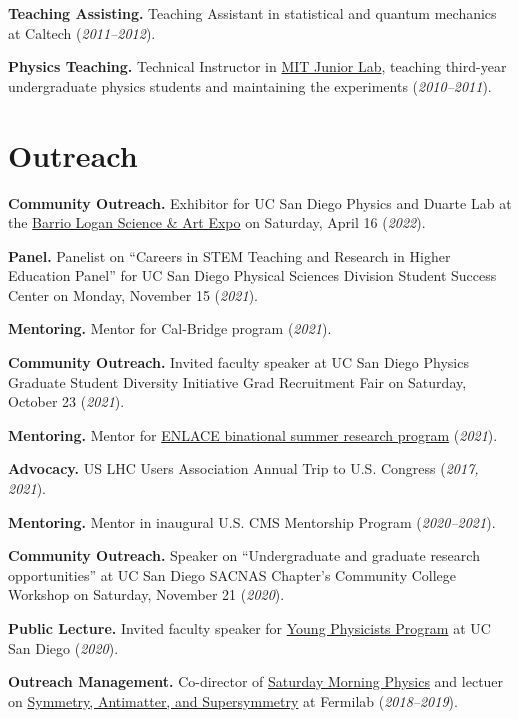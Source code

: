 \documentclass{res}
\newcommand{\MarginText}[1]{\section{#1}\vspace{10pt}}
\begin{document}
\begin{resume}
  \textbf{Teaching Assisting.} Teaching Assistant in statistical and quantum mechanics at Caltech (\textit{2011--2012}).

  \textbf{Physics Teaching.} Technical Instructor in \href{http://web.mit.edu/8.13/www/index.shtml}{MIT Junior Lab}, teaching third-year undergraduate physics students and maintaining the experiments (\textit{2010--2011}).


  \MarginText{Outreach}

  \textbf{Community Outreach.} Exhibitor for UC San Diego Physics and Duarte Lab at the \href{https://www.barriologansae.com/}{Barrio Logan Science \& Art Expo} on Saturday, April 16 (\textit{2022}).

  \textbf{Panel.} Panelist on ``Careers in STEM Teaching and Research in Higher Education Panel'' for UC San Diego Physical Sciences Division Student Success Center on Monday, November 15 (\textit{2021}).

  \textbf{Mentoring.} Mentor for Cal-Bridge program (\textit{2021}).

  \textbf{Community Outreach.} Invited faculty speaker at UC San Diego Physics Graduate Student Diversity Initiative Grad Recruitment Fair on Saturday, October 23 (\textit{2021}).

  \textbf{Mentoring.} Mentor for \href{http://resilientmaterials.ucsd.edu/ENLACE}{ENLACE binational summer research program} (\textit{2021}).

  \textbf{Advocacy.} US LHC Users Association Annual Trip to U.S. Congress (\textit{2017, 2021}).

  \textbf{Mentoring.} Mentor in inaugural U.S. CMS Mentorship Program (\textit{2020--2021}).

  \textbf{Community Outreach.} Speaker on ``Undergraduate and graduate research opportunities'' at UC San Diego SACNAS Chapter's Community College Workshop on Saturday, November 21 (\textit{2020}).

  \textbf{Public Lecture.} Invited faculty speaker for \href{http://ypp.ucsd.edu/}{Young Physicists Program} at UC San Diego (\textit{2020}).

  \textbf{Outreach Management.} Co-director of \href{http://saturdaymorningphysics.fnal.gov/}{Saturday Morning Physics} and lectuer on \href{http://saturdaymorningphysics.fnal.gov/fall-session-2018/}{Symmetry, Antimatter, and Supersymmetry} at Fermilab (\textit{2018--2019}).


\end{resume}
\end{document}

